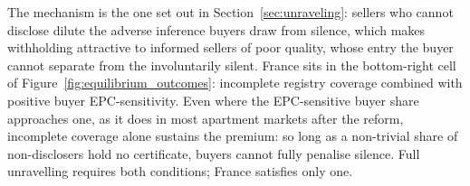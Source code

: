 The mechanism is the one set out in Section~\ref{sec:unraveling}: sellers who cannot
disclose dilute the adverse inference buyers draw from silence, which makes withholding
attractive to informed sellers of poor quality, whose entry the buyer cannot separate from
the involuntarily silent. France sits in the bottom-right cell of
Figure~\ref{fig:equilibrium_outcomes}: incomplete registry coverage combined with positive
buyer EPC-sensitivity. Even where the EPC-sensitive buyer share approaches one, as it does in
most apartment markets after the reform, incomplete coverage alone sustains the premium: so long as a non-trivial share of non-disclosers hold no certificate, buyers cannot fully
penalise silence. Full unravelling requires both conditions; France satisfies only one.
